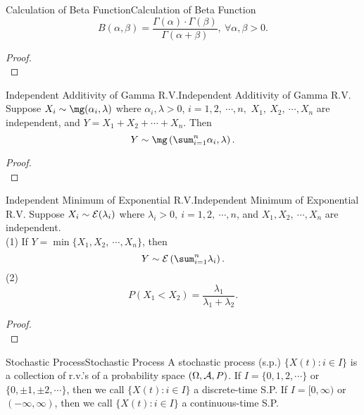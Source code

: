 \documentclass{elegantbook}
\begin{document}
\begin{lemma}{Calculation of Beta Function}{Calculation of Beta Function}
\[B(\alpha,\beta) = \frac{\Gamma( \alpha ) \cdot \Gamma( \beta )}{\Gamma( \alpha + \beta)},\ \forall\alpha,\beta > 0.\]
\end{lemma}

\begin{proof}
\\[4cm]\vspace{0.01cm}
\end{proof}

\begin{theorem}{Independent Additivity of Gamma R.V.}{Independent Additivity of Gamma R.V.}
Suppose $X_i\sim\mg(\alpha_i,\lambda)$ where $\alpha_i,\lambda>0$, $i=1,2,\ \cdots,n,$ ${X}_1,\ X_2,\ \cdots,X_n$ are independent, and $Y=X_1+X_2+\cdots+X_n$. Then
\[Y\sim\mg\left( \sum_{i = 1}^{n}\alpha_{i},\lambda \right).\]
\end{theorem}

\begin{proof}
\\[4cm]\vspace{0.01cm}
\end{proof}

\begin{theorem}{Independent Minimum of Exponential R.V.}{Independent Minimum of Exponential R.V.}
Suppose $X_i\sim\mathcal{E}(\lambda_i)$ where $\lambda_i>0,\ i=1,2,\ \cdots,n$, and ${X}_1,X_2,\ \cdots,X_n$ are independent.\\
(1) If $Y=\min\{X_1,X_2,\ \cdots,X_n\}$, then
\[Y\sim\me\left( \sum_{i = 1}^{n}\lambda_{i} \right).\]
(2)
$$
P(X_1<X_2)=\frac{\lambda_1}{\lambda_1+\lambda_2}.
$$
\end{theorem}

\begin{proof}
\\[4cm]\vspace{0.01cm}
\end{proof}

\begin{definition}{Stochastic Process}{Stochastic Process}
A stochastic process (s.p.) $\{X(t):i\in I\}$ is a collection of r.v.'s of a probability space $(\Omega,\mathcal{A}, P)$. If $I=\{0,1,2,\cdots\}$ or $\{0,\pm1,\pm2,\cdots\}$, then we call $\{X(t):i\in I\}$ a discrete-time S.P. If $I=[0,\infty)$ or $(-\infty,\infty)$, then we call $\{X(t):i\in I\}$ a continuous-time S.P.
\end{definition}
\end{document}
